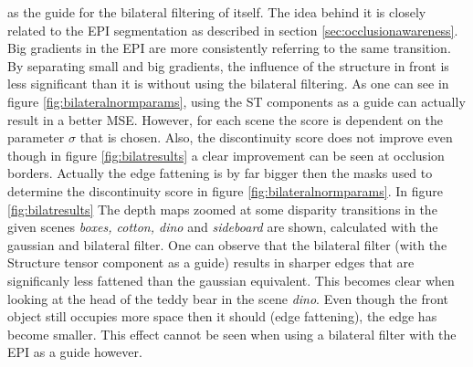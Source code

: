 \documentclass  [
  paper    = a4,
  BCOR     = 10mm,
  twoside,
  fontsize = 12pt,
  fleqn,
  toc      = bibnumbered,
  toc      = listofnumbered,
  numbers  = noendperiod,
  headings = normal,
  listof   = leveldown,
  version  = 3.03
]                                       {scrreprt}
\begin{document}
 as the guide for the bilateral filtering of itself. The idea behind it is closely related to the EPI segmentation as described in section \ref{sec:occlusionawareness}. Big gradients in the EPI are more consistently referring to the same transition. By separating small and big gradients, the influence of the structure in front is less significant than it is without using the bilateral filtering. As one can see in figure \ref{fig:bilateralnormparams}, using the ST components as a guide can actually result in a better MSE. However, for each scene the score is dependent on the parameter $\sigma$ that is chosen. Also, the discontinuity score does not improve even though in figure \ref{fig:bilatresults} a clear improvement can be seen at occlusion borders. Actually the edge fattening is by far bigger then the masks used to determine the discontinuity score in figure \ref{fig:bilateralnormparams}. In figure \ref{fig:bilatresults} The depth maps zoomed at some disparity transitions in the given scenes \textit{boxes, cotton, dino} and \textit{sideboard} are shown, calculated with the gaussian and bilateral filter. One can observe that the bilateral filter (with the Structure tensor component as a guide) results in sharper edges that are significanly less \glqq fattened \grqq than the gaussian equivalent. This becomes clear when looking at the head of the teddy bear in the scene \textit{dino}. Even though the front object still occupies more space then it should (edge fattening), the edge has become smaller. This effect cannot be seen when using a bilateral filter with the EPI as a guide however.
\end{document}
